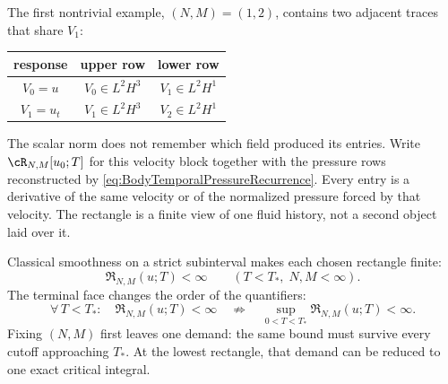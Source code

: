 The first nontrivial example, \((N,M)=(1,2)\), contains two adjacent traces
that share \(V_1\):
\begin{center}
\captionsetup{hypcap=false}
\label{tab:FirstAdjacentRectangle}
\renewcommand{\arraystretch}{1.3}
\begin{tabular}{@{}c c c@{}}
\toprule
response & upper row & lower row \\
\midrule
\(V_0=u\) & \(V_0\in L^2H^3\) & \(V_1\in L^2H^1\) \\
\(V_1=u_t\) & \(V_1\in L^2H^3\) & \(V_2\in L^2H^1\) \\
\bottomrule
\end{tabular}
\end{center}

The scalar norm does not remember which field produced its entries.  Write
\(\cR_{N,M}[u_0;T]\) for this velocity block together with the pressure rows
reconstructed by \eqref{eq:BodyTemporalPressureRecurrence}.  Every entry is a
derivative of the same velocity or of the normalized pressure forced by that
velocity.  The rectangle is a finite view of one fluid history, not a second
object laid over it.

Classical smoothness on a strict subinterval makes each chosen rectangle
finite:
\begin{equation}\label{eq:StrictSubintervalRectangleBound}
  \mathfrak R_{N,M}(u;T)<\infty
  \qquad(T<T_*,\;N,M<\infty).
\end{equation}
The terminal face changes the order of the quantifiers:
\[
  \forall\,T<T_*:\quad \mathfrak R_{N,M}(u;T)<\infty
  \quad\not\Longrightarrow\quad
  \sup_{0<T<T_*}\mathfrak R_{N,M}(u;T)<\infty.
\]
Fixing \((N,M)\) first leaves one demand: the same bound must survive every
cutoff approaching \(T_*\).  At the lowest rectangle, that demand can be
reduced to one exact critical integral.
